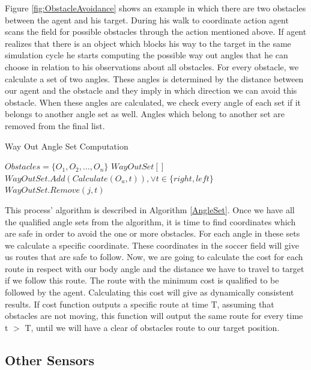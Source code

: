 Figure \ref{fig:ObstacleAvoidance} shows an example in which there are two obstacles between the agent and his target. During his walk to coordinate action agent scans the field for possible obstacles through the action mentioned above. If agent realizes that there is an object which blocks his way to the target in the same simulation cycle he starts computing the possible way out angles that he can choose in relation to his observations about all obstacles. For every obstacle, we calculate a set of two angles. These angles is determined by the distance between our agent and the obstacle and they imply in which direction we can avoid this obstacle. When these angles are calculated, we check every angle of each set if it belongs to another angle set as well. Angles which belong to another set are removed from the final list.
\begin{algorithm}[htb!]
\caption{Way Out Angle Set Computation}
\label{AngleSet}
\begin{algorithmic}[1]
$Obstacles = \lbrace O_{1},O_{2},...,O_{n} \rbrace $
$WayOutSet[ ]$
\STATE $WayOutSet.Add(Calculate(O_{a},t)),\vee t \in \lbrace right,left \rbrace$
\ENDFOR
{}
\STATE $WayOutSet.Remove(j,t)$
\ENDIF
\ENDFOR
\ENDFOR
\end{algorithmic}
\end{algorithm}

This process' algorithm is described in Algorithm \ref{AngleSet}. Once we have all the qualified angle sets from the algorithm, it is time to find coordinates which are safe in order to avoid the one or more obstacles. For each angle in these sets we calculate a specific coordinate. These coordinates in the soccer field will give us routes that are safe to follow. Now, we are going to calculate the cost for each route in respect with our body angle and the distance we have to travel to target if we follow this route. The route with the minimum cost is qualified to be followed by the agent. Calculating this cost will give as dynamically consistent results. If cost function outputs a specific route at time T, assuming that obstacles are not moving, this function will output the same route for every time t $>$ T, until we will have a clear of obstacles route to our target position.


\subsection{Other Sensors}


